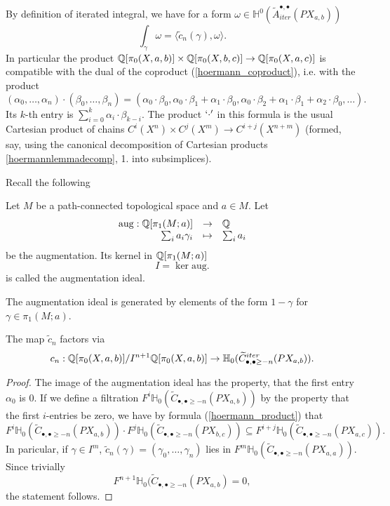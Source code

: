 By definition of iterated integral, we have for a form $\omega \in \mathbb{H}^0(\widetilde{A}_{iter}^{\bullet, \bullet}(PX_{a,b}))$
\[ \int_\gamma \omega = \langle \widetilde{c}_n(\gamma), \omega \rangle.  \]
In particular the product $\mathbb{Q}[\pi_0(X, a,b)] \times \mathbb{Q}[\pi_0(X, b,c)] \rightarrow \mathbb{Q}[\pi_0(X, a,c)]$
is compatible with the dual of the coproduct (\ref{hoermann_coproduct}), i.e. with the product
\begin{equation}\label{hoermann_product} 
(\alpha_0, \dots, \alpha_n) \cdot (\beta_0, \dots, \beta_n) = (\alpha_0 \cdot \beta_0, \alpha_0 \cdot \beta_1 + \alpha_1 \cdot \beta_0, \alpha_0 \cdot \beta_2 + \alpha_1 \cdot \beta_1 + \alpha_2 \cdot \beta_0, \dots).
\end{equation}
Its $k$-th entry is $\sum_{i=0}^k \alpha_i \cdot  \beta_{k-i}$. 
The product $`\cdot'$ in this formula is the usual Cartesian product of chains $C^i(X^n) \times C^j(X^m) \rightarrow C^{i+j}(X^{n+m})$ (formed, say, using the canonical decomposition of Cartesian products \ref{hoermannlemmadecomp}, 1. into subsimplices).

Recall the following
\begin{defn}\label{def:augmentationideal}
Let $M$ be a path-connected topological space and $a \in M$. Let
\[
\begin{array}{rcl}
\mathrm{aug} : \mathbb{Q}[\pi_1(M;a)] & \to & \mathbb{Q} \\
\sum_i a_i \gamma_i & \mapsto & \sum_i a_i
\end{array}
\]
be the augmentation. Its kernel in $\mathbb{Q}[\pi_1(M;a)]$
\[
I = \ker \mathrm{aug}.
\]
is called the augmentation ideal.
\end{defn}
The augmentation ideal is generated by elements of the form $1-\gamma$ for $\gamma \in \pi_1(M;a)$.


\begin{cor}
The map $\widetilde{c}_n$ factors via 
\[ c_n:  \mathbb{Q}[\pi_0(X, a,b)]/I^{n+1} \mathbb{Q}[\pi_0(X, a,b)] \rightarrow \mathbb{H}_0(\widetilde{C}_{\bullet ,\bullet \ge -n}^{iter}(PX_{a,b})).   \]
\end{cor}
\begin{proof}
The image of the augmentation ideal has the property, that the first entry $\alpha_0$ is 0. If we define a filtration
$F^i \mathbb{H}_0(\widetilde{C}_{\bullet ,\bullet \ge -n}(PX_{a,b}))$ by the property that the first $i$-entries be zero, we have by formula (\ref{hoermann_product}) that
\[ F^i \mathbb{H}_0(\widetilde{C}_{\bullet,\bullet  \ge -n}(PX_{a,b})) \cdot  F^j \mathbb{H}_0(\widetilde{C}_{\bullet,\bullet  \ge -n}(PX_{b,c})) \subseteq F^{i+j} \mathbb{H}_0(\widetilde{C}_{\bullet,\bullet  \ge -n}(PX_{a,c})). \]
In paricular, if $\gamma \in I^m$, $\widetilde{c}_n(\gamma) = (\gamma_0, \dots, \gamma_n)$ lies in $F^m \mathbb{H}_0(\widetilde{C}_{\bullet,\bullet  \ge -n}(PX_{a,a}) )$. Since trivially
\[ F^{n+1} \mathbb{H}_0(\widetilde{C}_{\bullet,\bullet  \ge -n}(PX_{a,b}) = 0, \]
the statement follows.
\end{proof}

